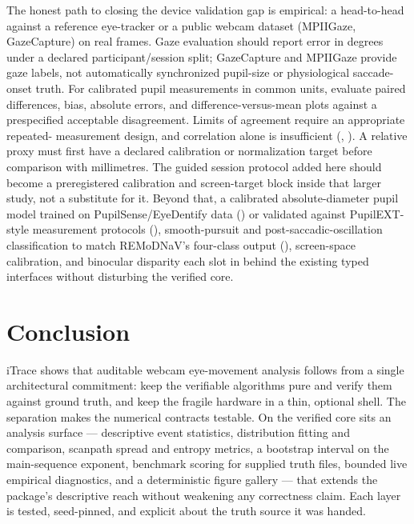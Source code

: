 \documentclass[
]{article}
\begin{document}
The honest path to closing the device validation gap is empirical: a
head-to-head against a reference eye-tracker or a public webcam dataset
(MPIIGaze, GazeCapture) on real frames. Gaze evaluation should report
error in degrees under a declared participant/session split; GazeCapture
and MPIIGaze provide gaze labels, not automatically synchronized
pupil-size or physiological saccade-onset truth. For calibrated pupil
measurements in common units, evaluate paired differences, bias,
absolute errors, and difference-versus-mean plots against a prespecified
acceptable disagreement. Limits of agreement require an appropriate
repeated- measurement design, and correlation alone is insufficient
(,
). A relative proxy must first
have a declared calibration or normalization target before comparison
with millimetres. The guided session protocol added here should become a
preregistered calibration and screen-target block inside that larger
study, not a substitute for it. Beyond that, a calibrated
absolute-diameter pupil model trained on PupilSense/EyeDentify data
() or validated
against PupilEXT-style measurement protocols
(), smooth-pursuit
and post-saccadic-oscillation classification to match REMoDNaV's
four-class output (),
screen-space calibration, and binocular disparity each slot in behind
the existing typed interfaces without disturbing the verified core.

\section{Conclusion}\label{sec:conclusion}

iTrace shows that auditable webcam eye-movement analysis follows from a
single architectural commitment: keep the verifiable algorithms pure and
verify them against ground truth, and keep the fragile hardware in a
thin, optional shell. The separation makes the numerical contracts
testable. On the verified core sits an analysis surface --- descriptive
event statistics, distribution fitting and comparison, scanpath spread
and entropy metrics, a bootstrap interval on the main-sequence exponent,
benchmark scoring for supplied truth files, bounded live empirical
diagnostics, and a deterministic figure gallery --- that extends the
package's descriptive reach without weakening any correctness claim.
Each layer is tested, seed-pinned, and explicit about the truth source
it was handed.
\end{document}
